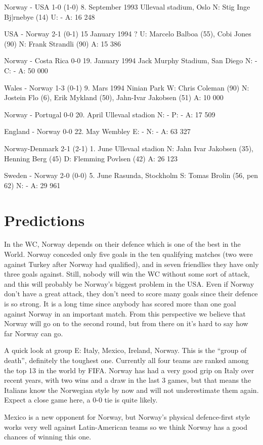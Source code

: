 Norway - USA 1-0 (1-0)
8. September 1993
Ullevaal stadium, Oslo
N: Stig Inge Bj|rnebye (14)
U: -
A: 16 248

USA - Norway 2-1 (0-1)
15 January 1994
?
U: Marcelo Balboa (55), Cobi Jones (90)
N: Frank Strandli (90)
A: 15 386

Norway - Costa Rica 0-0
19. January 1994
Jack Murphy Stadium, San Diego
N: -
C: -
A: 50 000

Wales - Norway 1-3 (0-1)
9. Mars 1994
Ninian Park
W: Chris Coleman (90)
N: Jostein Flo (6), Erik Mykland (50), Jahn-Ivar Jakobsen (51)
A: 10 000

Norway - Portugal 0-0
20. April
Ullevaal stadion
N: -
P: -
A: 17 509

England - Norway 0-0
22. May
Wembley
E: -
N: -
A: 63 327

Norway-Denmark 2-1 (2-1)
1. June
Ullevaal stadion
N: Jahn Ivar Jakobsen (35), Henning Berg (45)
D: Flemming Povlsen (42)
A: 26 123

Sweden - Norway 2-0 (0-0)
5. June
Rasunda, Stockholm
S: Tomas Brolin (56, pen 62)
N: -
A: 29 961
\section{Predictions}
In the WC, Norway depends on their defence which is one of the best in the 
World. Norway conceded only five goals in the ten qualifying matches (two were 
against Turkey after Norway had qualified), and in seven friendlies they have 
only three goals against. Still, nobody will win the WC without some sort of 
attack, and this will probably be Norway's biggest problem in the USA. Even if 
Norway don't have a great attack, they don't need to score many goals since 
their defence is so strong. It is a long time since anybody has scored more 
than one goal against Norway in an important match. From this perspective we 
believe that Norway will go on to the second round, but from there on it's 
hard to say how far Norway can go.

A quick look at group E: Italy, Mexico, Ireland, Norway.
This is the ``group of death'', definitely the toughest one. Currently all four 
teams are ranked among the top 13 in the world by FIFA. Norway has had a very 
good grip on Italy over recent years, with two wins and a draw in the last 3 
games, but that means the Italians know the Norwegian style by now and will not 
underestimate them again. Expect a close game here, a 0-0 tie is quite likely.

Mexico is a new opponent for Norway, but Norway's physical defence-first style 
works very well against Latin-American teams so we think Norway has a good 
chances of winning this one.

